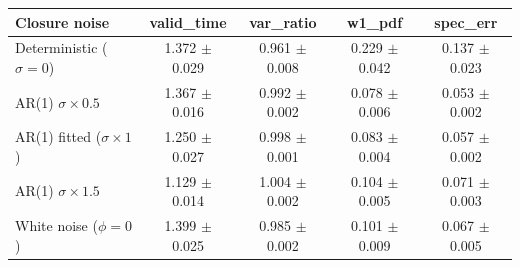 \begin{tabular}{lcccc}
\toprule
Closure noise & valid\_time & var\_ratio & w1\_pdf & spec\_err \\
\midrule
Deterministic ($\sigma\!=\!0$) & 1.372 $\pm$ 0.029 & 0.961 $\pm$ 0.008 & 0.229 $\pm$ 0.042 & 0.137 $\pm$ 0.023 \\
AR(1) $\sigma\times0.5$ & 1.367 $\pm$ 0.016 & 0.992 $\pm$ 0.002 & 0.078 $\pm$ 0.006 & 0.053 $\pm$ 0.002 \\
AR(1) fitted ($\sigma\times1$) & 1.250 $\pm$ 0.027 & 0.998 $\pm$ 0.001 & 0.083 $\pm$ 0.004 & 0.057 $\pm$ 0.002 \\
AR(1) $\sigma\times1.5$ & 1.129 $\pm$ 0.014 & 1.004 $\pm$ 0.002 & 0.104 $\pm$ 0.005 & 0.071 $\pm$ 0.003 \\
White noise ($\phi\!=\!0$) & 1.399 $\pm$ 0.025 & 0.985 $\pm$ 0.002 & 0.101 $\pm$ 0.009 & 0.067 $\pm$ 0.005 \\
\bottomrule
\end{tabular}
